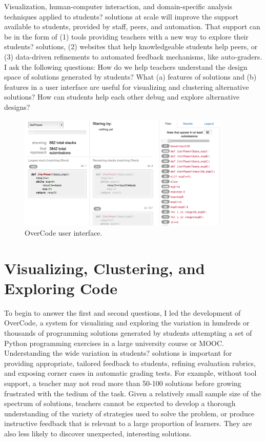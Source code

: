 \documentclass{sigchi}
\begin{document}
Visualization, human-computer interaction, and domain-specific analysis techniques applied to students? solutions at scale will improve the support available to students, provided by staff, peers, and automation. That support can be in the form of (1) tools providing teachers with a new way to explore their students? solutions, (2) websites that help knowledgeable students help peers, or (3) data-driven refinements to automated feedback mechanisms, like auto-graders. I ask the following questions:
How do we help teachers understand the design space of solutions generated by students?
What (a) features of solutions and (b) features in a user interface are useful for visualizing and clustering alternative solutions?
How can students help each other debug and explore alternative designs?

\begin{figure}[t!]
\centering
\includegraphics[width=0.9\textwidth]{frontPageInterfacePreview.png}
\caption{OverCode user interface.}
\label{fig:figure1}
\end{figure}

\section{Visualizing, Clustering, and Exploring Code}
To begin to answer the first and second questions, I led the development of OverCode, a system for visualizing and exploring the variation in hundreds or thousands of programming solutions generated by students attempting a set of Python programming exercises in a large university course or MOOC. Understanding the wide variation in students? solutions is important for providing appropriate, tailored feedback to students, refining evaluation rubrics, and exposing corner cases in automatic grading tests. For example, without tool support, a teacher may not read more than 50-100 solutions before growing frustrated with the tedium of the task. Given a relatively small sample size of the spectrum of solutions, teachers cannot be expected to develop a thorough understanding of the variety of strategies used to solve the problem, or produce instructive feedback that is relevant to a large proportion of learners. They are also less likely to discover unexpected, interesting solutions.
\end{document}
